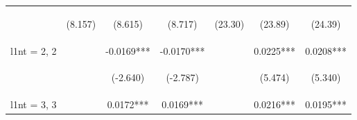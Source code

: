 \documentclass{standalone}
\begin{document}
\begin{tabular}{lcccccc}
    \vspace{4pt}     & \begin{footnotesize}(8.157)\end{footnotesize}   & \begin{footnotesize}(8.615)\end{footnotesize}   & \begin{footnotesize}(8.717)\end{footnotesize}   & \begin{footnotesize}(23.30)\end{footnotesize}  & \begin{footnotesize}(23.89)\end{footnotesize}  & \begin{footnotesize}(24.39)\end{footnotesize}  \\
    l1nt = 2, 2      &                                                 & -0.0169***                                      & -0.0170***                                      &                                                & 0.0225***                                      & 0.0208***                                      \\
    \vspace{4pt}     & \begin{footnotesize}\end{footnotesize}          & \begin{footnotesize}(-2.640)\end{footnotesize}  & \begin{footnotesize}(-2.787)\end{footnotesize}  & \begin{footnotesize}\end{footnotesize}         & \begin{footnotesize}(5.474)\end{footnotesize}  & \begin{footnotesize}(5.340)\end{footnotesize}  \\
    l1nt = 3, 3      &                                                 & 0.0172***                                       & 0.0169***                                       &                                                & 0.0216***                                      & 0.0195***                                      \\

\end{tabular}
\end{document}
